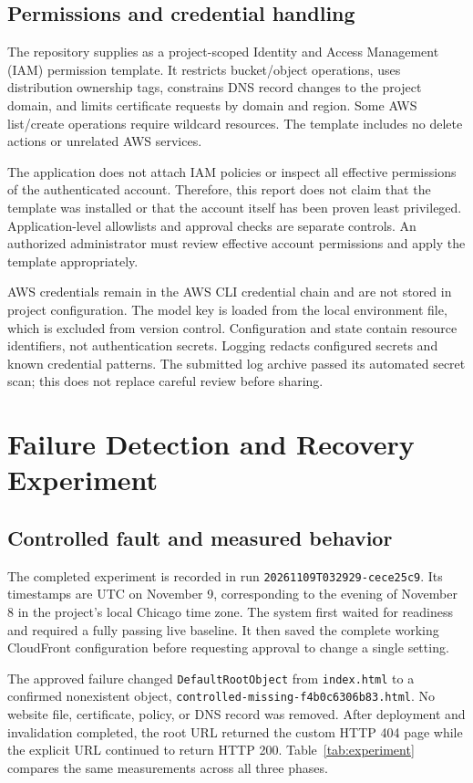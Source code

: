 \documentclass[11pt]{article}
\begin{document}
\subsection{Permissions and credential handling}
The repository supplies  as a project-scoped Identity and Access Management (IAM) permission template. It restricts bucket/object operations, uses distribution ownership tags, constrains DNS record changes to the project domain, and limits certificate requests by domain and region. Some AWS list/create operations require wildcard resources. The template includes no delete actions or unrelated AWS services.

The application does not attach IAM policies or inspect all effective permissions of the authenticated account. Therefore, this report does not claim that the template was installed or that the account itself has been proven least privileged. Application-level allowlists and approval checks are separate controls. An authorized administrator must review effective account permissions and apply the template appropriately.

AWS credentials remain in the AWS CLI credential chain and are not stored in project configuration. The model key is loaded from the local environment file, which is excluded from version control. Configuration and state contain resource identifiers, not authentication secrets. Logging redacts configured secrets and known credential patterns. The submitted log archive passed its automated secret scan; this does not replace careful review before sharing.

\section{Failure Detection and Recovery Experiment}
\subsection{Controlled fault and measured behavior}
The completed experiment is recorded in run \texttt{20261109T032929-cece25c9}. Its timestamps are UTC on November 9, corresponding to the evening of November 8 in the project's local Chicago time zone. The system first waited for readiness and required a fully passing live baseline. It then saved the complete working CloudFront configuration before requesting approval to change a single setting.

The approved failure changed \texttt{DefaultRootObject} from \texttt{index.html} to a confirmed nonexistent object, \texttt{controlled-missing-f4b0c6306b83.html}. No website file, certificate, policy, or DNS record was removed. After deployment and invalidation completed, the root URL returned the custom HTTP 404 page while the explicit  URL continued to return HTTP 200. Table~\ref{tab:experiment} compares the same measurements across all three phases.
\end{document}
